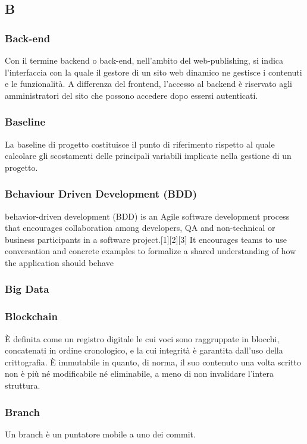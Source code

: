 \subsection*{\textbf{\hfill \Huge{B} \hfill}} 
\subsubsection*{Back-end}
Con il termine backend o back-end, nell'ambito del web-publishing, si indica l'interfaccia con la quale il gestore di un sito web dinamico ne gestisce i contenuti e le funzionalità. A differenza del frontend, l'accesso al backend è riservato agli amministratori del sito che possono accedere dopo essersi autenticati.
\subsubsection*{Baseline}
La baseline di progetto costituisce il punto di riferimento rispetto al quale calcolare gli scostamenti delle principali variabili implicate nella gestione di un progetto.
\subsubsection*{Behaviour Driven Development (BDD)}
behavior-driven development (BDD) is an Agile software development process that encourages collaboration among developers, QA and non-technical or business participants in a software project.[1][2][3] It encourages teams to use conversation and concrete examples to formalize a shared understanding of how the application should behave
\subsubsection*{Big Data}

\subsubsection*{Blockchain}
È definita come un registro digitale le cui voci sono raggruppate in blocchi, concatenati in ordine cronologico, e la cui integrità è garantita dall’uso della crittografia. È immutabile in quanto, di norma, il suo contenuto una volta scritto non è più né modificabile né eliminabile, a meno di non invalidare l’intera struttura.
\subsubsection*{Branch}
Un branch è un puntatore mobile a uno dei commit.

